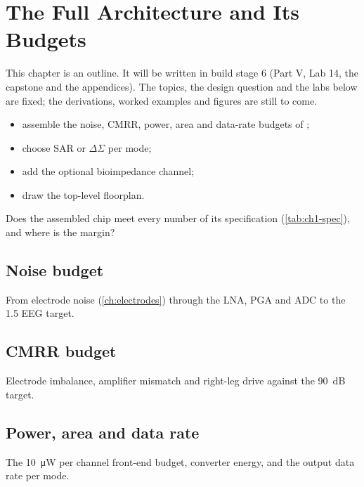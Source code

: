 \chapter{The Full Architecture and Its Budgets}\label{ch:arch}

\begin{specnote}
This chapter is an outline. It will be written in build stage 6 (Part V, Lab 14, the capstone and the appendices). The topics, the design question and the labs below are fixed; the derivations, worked examples and figures are still to come.
\end{specnote}

\begin{objectives}
\begin{itemize}
  \item assemble the noise, CMRR, power, area and data-rate budgets of \OB{};
  \item choose SAR or $\Delta\Sigma$ per mode;
  \item add the optional bioimpedance channel;
  \item draw the top-level floorplan.
\end{itemize}
\end{objectives}

\begin{insight}
Does the assembled \OB{} chip meet every number of its specification (\cref{tab:ch1-spec}), and where is the margin?
\end{insight}

\section{Noise budget}\label{sec:ch29-1}
From electrode noise (\cref{ch:electrodes}) through the LNA, PGA and ADC to the \qty{1.5}{\uVrms} EEG target.

\section{CMRR budget}\label{sec:ch29-2}
Electrode imbalance, amplifier mismatch and right-leg drive against the \qty{90}{\deci\bel} target.

\section{Power, area and data rate}\label{sec:ch29-3}
The \qty{10}{\micro\watt} per channel front-end budget, converter energy, and the output data rate per mode.

